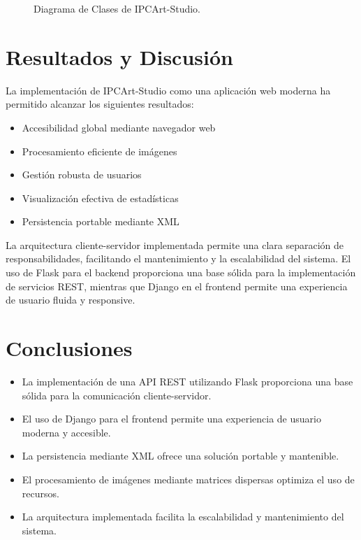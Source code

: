 \documentclass[letterpaper,12pt]{article}
\begin{document}
\begin{figure}[H]
    \centering
    
    \caption{Diagrama de Clases de IPCArt-Studio.}
    \label{fig:diagrama_clases}
\end{figure}

\clearpage

\begin{multicols}{2}


    \section*{Resultados y Discusión}
    La implementación de IPCArt-Studio como una aplicación web moderna ha permitido alcanzar los siguientes resultados:

    \begin{itemize}
        \item Accesibilidad global mediante navegador web
        \item Procesamiento eficiente de imágenes
        \item Gestión robusta de usuarios
        \item Visualización efectiva de estadísticas
        \item Persistencia portable mediante XML
    \end{itemize}

    La arquitectura cliente-servidor implementada permite una clara separación de responsabilidades, facilitando el mantenimiento y la escalabilidad del sistema. El uso de Flask para el backend proporciona una base sólida para la implementación de servicios REST, mientras que Django en el frontend permite una experiencia de usuario fluida y responsive.

    \section*{Conclusiones}
    \begin{itemize}
        \item La implementación de una API REST utilizando Flask proporciona una base sólida para la comunicación cliente-servidor.
        \item El uso de Django para el frontend permite una experiencia de usuario moderna y accesible.
        \item La persistencia mediante XML ofrece una solución portable y mantenible.
        \item El procesamiento de imágenes mediante matrices dispersas optimiza el uso de recursos.
        \item La arquitectura implementada facilita la escalabilidad y mantenimiento del sistema.
    \end{itemize}


\end{multicols}
\end{document}
